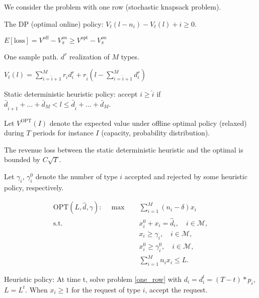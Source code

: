 
We consider the problem with one row (stochastic knapsack problem).

The DP (optimal online) policy: $V_{t}(l- n_{i}) - V_{t}(l) + i \geq 0$.

$E[\text{loss}] = V^{\text{off}} - V_{\pi}^{on} \geq V^{\text{opt}} - V_{\pi}^{on}$

One sample path. $d^{r}$ realization of $M$ types. 

$V_{t}(l) = \sum_{i = \hat{i}+1}^{M} r_{i} d_{i}^{r} + r_{\hat{i}}(l- \sum_{i= \hat{i}+1}^{M} d_{i}^{r})$

Static deterministic heuristic policy: accept $i \geq \hat{i}$ if $\bar{d}_{\hat{i}+1}+ \ldots + \bar{d}_{M} < l \leq \bar{d}_{\hat{i}}+ \ldots + \bar{d}_{M}$.


Let $V^{\text{OPT}}(I)$ denote the expected value under offline optimal policy (relaxed) during $T$ periods for instance $I$ (capacity, probability distribution).

The revenue loss between the static deterministic heuristic and the optimal is bounded by $C \sqrt{T}$.

Let $\gamma_{i}$, $\gamma_{i}^{0}$ denote the number of type $i$ accepted and rejected by some heuristic policy, respectively.



\begin{align*}
    \text{OPT}(L, \hat{d}, \gamma): \quad \max \quad & \sum_{i = 1}^{M} (n_i - \delta) x_{i} \\
    \text {s.t.} \quad & x_{i}^{0} + x_{i} = \hat{d}_{i}, \quad i \in \mathcal{M},  \\ 
    & x_{i} \geq \gamma_{i}, \quad i \in \mathcal{M}, \\
    & x_{i}^{0} \geq \gamma_{i}^{0}, \quad i \in \mathcal{M}, \\
    & \sum_{i=1}^{M} n_{i} x_{i} \leq L.
\end{align*}

Heuristic policy: At time t, solve problem \eqref{one_row} with $d_{i} = d_{i}^{t} = (T-t) * p_{i}$, $L = L^{t}$. When $x_{i}\geq 1$ for the request of type $i$, accept the request.



